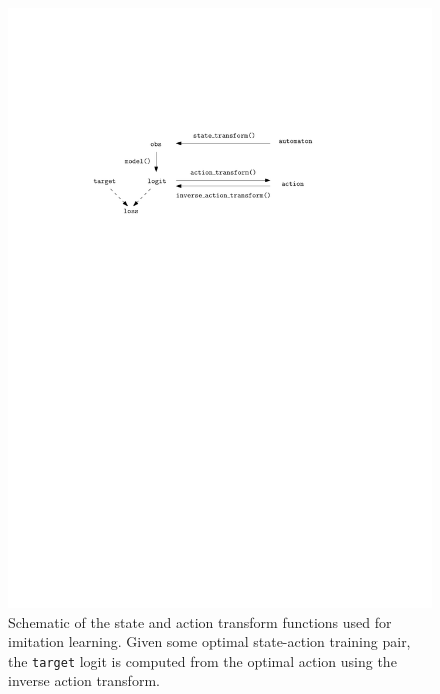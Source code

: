 \documentclass[a4paper]{article}
\theoremstyle{definition}
\theoremstyle{plain}
\begin{document}
\begin{figure}[h]
  \centering
  \includegraphics[scale=1]{figures/state_action_transforms}
  \caption{Schematic of the state and action transform functions used for
    imitation learning. Given some optimal state-action training pair, the
    \texttt{target} logit is computed from the optimal action using the inverse
    action transform.}
  \label{fig:state-action-transforms}
\end{figure}


\newpage
\end{document}
